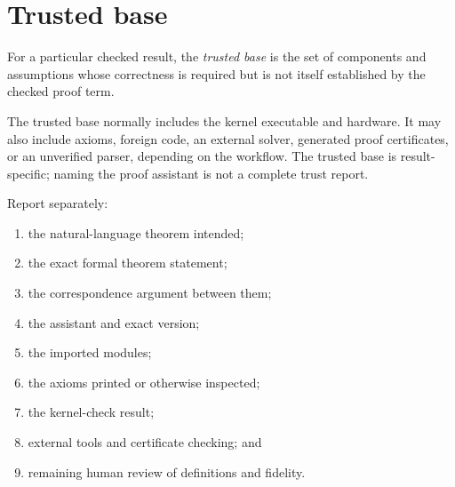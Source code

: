 \section{Trusted base}
\label{sec:mechanization-03}

\begin{definition}
For a particular checked result, the \emph{trusted base} is the set of
components and assumptions whose correctness is required but is not itself
established by the checked proof term.
\end{definition}

The trusted base normally includes the kernel executable and hardware.  It may
also include axioms, foreign code, an external solver, generated proof
certificates, or an unverified parser, depending on the workflow.  The trusted
base is result-specific; naming the proof assistant is not a complete trust
report.

\begin{method}
Report separately:
\begin{enumerate}
  \item the natural-language theorem intended;
  \item the exact formal theorem statement;
  \item the correspondence argument between them;
  \item the assistant and exact version;
  \item the imported modules;
  \item the axioms printed or otherwise inspected;
  \item the kernel-check result;
  \item external tools and certificate checking; and
  \item remaining human review of definitions and fidelity.
\end{enumerate}
\end{method}

